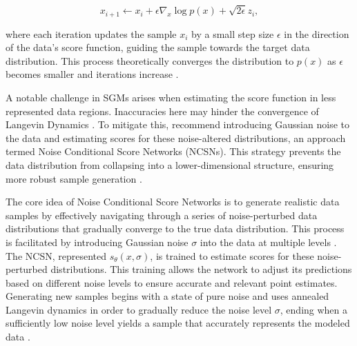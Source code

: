 \[ 
  x_{i+1} \leftarrow x_i + \epsilon \nabla_x \log p(x) + \sqrt{2 \epsilon} z_i,
\]

where each iteration updates the sample \(x_i\) by a small step size \(\epsilon\) in the direction of the data's score function, guiding the sample towards the target data distribution. This process theoretically converges the distribution to \( p(x) \) as \( \epsilon \) becomes smaller and iterations increase \citep{song2019SGM,song2021score}.

A notable challenge in SGMs arises when estimating the score function in less represented data regions. Inaccuracies here may hinder the convergence of Langevin Dynamics \citep{song2019SGM}. To mitigate this, \citeauthor{song2019SGM} recommend introducing Gaussian noise to the data and estimating scores for these noise-altered distributions, an approach termed Noise Conditional Score Networks (NCSNs). This strategy prevents the data distribution from collapsing into a lower-dimensional structure, ensuring more robust sample generation \citep{song2019SGM}.

The core idea of Noise Conditional Score Networks is to generate realistic data samples by effectively navigating through a series of noise-perturbed data distributions that gradually converge to the true data distribution. This process is facilitated by introducing Gaussian noise \(\sigma\) into the data at multiple levels \citep{song2019SGM}. The NCSN, represented \(s_\theta(x, \sigma)\), is trained to estimate scores for these noise-perturbed distributions. This training allows the network to adjust its predictions based on different noise levels to ensure accurate and relevant point estimates. Generating new samples begins with a state of pure noise and uses annealed Langevin dynamics in order to gradually reduce the noise level \(\sigma\), ending when a sufficiently low noise level yields a sample that accurately represents the modeled data \citep{song2019SGM}.